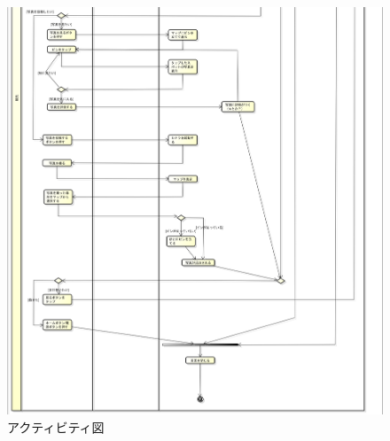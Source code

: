\documentclass[openany,11pt,papersize]{jsbook}
\begin{document}
\begin{appendix}
       \begin{figure}{}
        \begin{center}
\includegraphics[width=20cm, bb=0 0 1880 2041]{project_activity2.2-2.png}
        \end{center}
                 \caption{アクティビティ図}
 \label{fig:one}
      \end{figure}   
      

\end{appendix}


\end{document}
